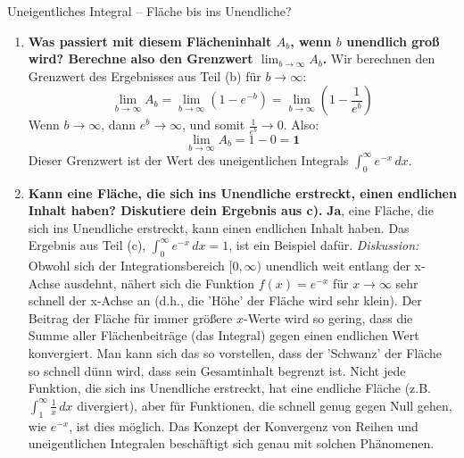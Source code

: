 \begin{loesungsumgebung}{Uneigentliches Integral – Fläche bis ins Unendliche?}
\begin{enumerate}[label=(\alph*)]
    \item \textbf{Was passiert mit diesem Flächeninhalt $A_b$, wenn $b$ unendlich groß wird? Berechne also den Grenzwert $\lim_{b \to \infty} A_b$.}
    Wir berechnen den Grenzwert des Ergebnisses aus Teil (b) für $b \to \infty$:
    $$ \lim_{b \to \infty} A_b = \lim_{b \to \infty} \left(1 - e^{-b}\right) = \lim_{b \to \infty} \left(1 - \frac{1}{e^b}\right) $$
    Wenn $b \to \infty$, dann $e^b \to \infty$, und somit $\frac{1}{e^b} \to 0$.
    Also:
    $$ \lim_{b \to \infty} A_b = 1 - 0 = \mathbf{1} $$
    Dieser Grenzwert ist der Wert des uneigentlichen Integrals $\int_0^\infty e^{-x} \,dx$.

    \item \textbf{Kann eine Fläche, die sich ins Unendliche erstreckt, einen endlichen Inhalt haben? Diskutiere dein Ergebnis aus c).}
    \textbf{Ja}, eine Fläche, die sich ins Unendliche erstreckt, kann einen endlichen Inhalt haben. Das Ergebnis aus Teil (c), $\int_0^\infty e^{-x} \,dx = 1$, ist ein Beispiel dafür.
    \textit{Diskussion:}
    Obwohl sich der Integrationsbereich $[0, \infty)$ unendlich weit entlang der x-Achse ausdehnt, nähert sich die Funktion $f(x)=e^{-x}$ für $x \to \infty$ sehr schnell der x-Achse an (d.h., die 'Höhe' der Fläche wird sehr klein). Der Beitrag der Fläche für immer größere $x$-Werte wird so gering, dass die Summe aller Flächenbeiträge (das Integral) gegen einen endlichen Wert konvergiert.
    Man kann sich das so vorstellen, dass der 'Schwanz' der Fläche so schnell dünn wird, dass sein Gesamtinhalt begrenzt ist. Nicht jede Funktion, die sich ins Unendliche erstreckt, hat eine endliche Fläche (z.B. $\int_1^\infty \frac{1}{x} \,dx$ divergiert), aber für Funktionen, die schnell genug gegen Null gehen, wie $e^{-x}$, ist dies möglich. Das Konzept der Konvergenz von Reihen und uneigentlichen Integralen beschäftigt sich genau mit solchen Phänomenen.
\end{enumerate}

\end{loesungsumgebung}


